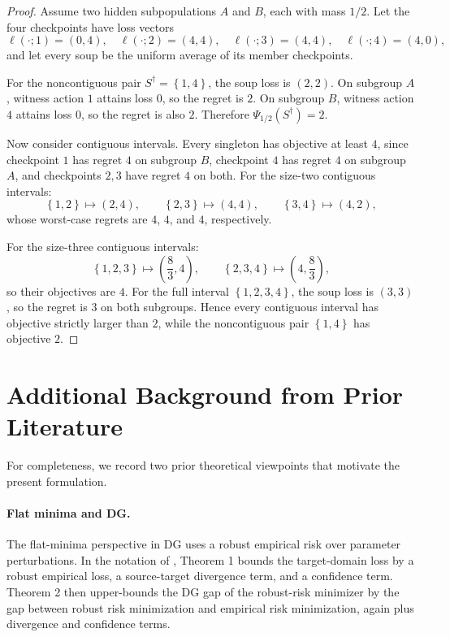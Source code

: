 \documentclass{article}
\newcommand{\braces}[1]{\left\{ #1 \right\}}
\newcommand{\loss}{\ell}
\newcommand{\1}{\mathbbm{1}}
\begin{document}
\begin{proof}
Assume two hidden subpopulations \(A\) and \(B\), each with mass \(1/2\). Let the four checkpoints have loss vectors
\[
    \loss(\cdot;1)=(0,4),\quad
    \loss(\cdot;2)=(4,4),\quad
    \loss(\cdot;3)=(4,4),\quad
    \loss(\cdot;4)=(4,0),
\]
and let every soup be the uniform average of its member checkpoints.

For the noncontiguous pair \(S^\dagger=\braces{1,4}\), the soup loss is \((2,2)\). On subgroup \(A\), witness action \(1\) attains loss \(0\), so the regret is \(2\). On subgroup \(B\), witness action \(4\) attains loss \(0\), so the regret is also \(2\). Therefore \(\Psi_{1/2}(S^\dagger)=2\).

Now consider contiguous intervals. Every singleton has objective at least \(4\), since checkpoint \(1\) has regret \(4\) on subgroup \(B\), checkpoint \(4\) has regret \(4\) on subgroup \(A\), and checkpoints \(2,3\) have regret \(4\) on both. For the size-two contiguous intervals:
\[
    \braces{1,2}\mapsto (2,4),\qquad
    \braces{2,3}\mapsto (4,4),\qquad
    \braces{3,4}\mapsto (4,2),
\]
whose worst-case regrets are \(4\), \(4\), and \(4\), respectively.

For the size-three contiguous intervals:
\[
    \braces{1,2,3}\mapsto \left(\frac{8}{3},4\right),\qquad
    \braces{2,3,4}\mapsto \left(4,\frac{8}{3}\right),
\]
so their objectives are \(4\). For the full interval \(\braces{1,2,3,4}\), the soup loss is \((3,3)\), so the regret is \(3\) on both subgroups. Hence every contiguous interval has objective strictly larger than \(2\), while the noncontiguous pair \(\braces{1,4}\) has objective \(2\).
\end{proof}

\section{Additional Background from Prior Literature}

For completeness, we record two prior theoretical viewpoints that motivate the present formulation.

\paragraph{Flat minima and DG.}
The flat-minima perspective in DG uses a robust empirical risk over parameter perturbations. In the notation of \citet{cha2021swad}, Theorem 1 bounds the target-domain loss by a robust empirical loss, a source-target divergence term, and a confidence term. Theorem 2 then upper-bounds the DG gap of the robust-risk minimizer by the gap between robust risk minimization and empirical risk minimization, again plus divergence and confidence terms.
\end{document}
